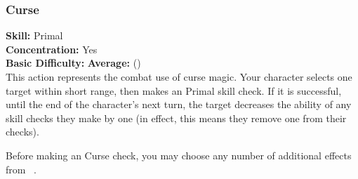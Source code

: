 \subsubsection{Curse}
\textbf{Skill:} Primal\\
\textbf{Concentration:} Yes\\
\textbf{Basic Difficulty:} \textbf{Average:} (\difficulty\difficulty)\\
This action represents the combat use of curse magic. Your
character selects one target within short range, then makes
an Primal skill check.  If it is successful, until the
end of the character’s next turn, the target decreases the
ability of any skill checks they make by one (in effect, this
means they remove one \proficiency from their checks).
 
Before making an Curse check, you may choose any number of
additional effects from ~.
